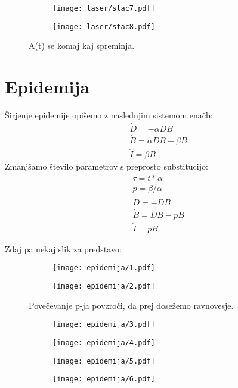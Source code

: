 \documentclass{article}
\begin{document}
\begin{figure}[H]
\centering
\begin{subfigure}{.49\textwidth}
\texttt{[image: laser/stac7.pdf]}
\end{subfigure}
\begin{subfigure}{.49\textwidth}
\texttt{[image: laser/stac8.pdf]}
\end{subfigure}
\caption*{A(t) se komaj kaj spreminja.}
\end{figure}


\section{Epidemija}

Širjenje epidemije opišemo z naslednjim sistemom enačb:
\begin{align*}
&\dot{D} = - \alpha D B \\
&\dot{B} = \alpha D B - \beta B \\
&\dot{I} = \beta B
\end{align*}
Zmanjšamo število parametrov s preprosto substitucijo:
\begin{align*}
&\tau = t*\alpha \\
&p = \beta / \alpha \\
&\dot{D} = - D B \\
&\dot{B} = D B - p B \\
&\dot{I} = p B
\end{align*}

Zdaj pa nekaj slik za predstavo:

\begin{figure}[H]
\centering
\begin{subfigure}{.49\textwidth}
\texttt{[image: epidemija/1.pdf]}
\end{subfigure}
\begin{subfigure}{.49\textwidth}
\texttt{[image: epidemija/2.pdf]}
\end{subfigure}
\caption*{Povečevanje p-ja povzroči, da prej dosežemo ravnovesje.}
\end{figure}

\begin{figure}[H]
\centering
\begin{subfigure}{.49\textwidth}
\texttt{[image: epidemija/3.pdf]}
\end{subfigure}
\begin{subfigure}{.49\textwidth}
\texttt{[image: epidemija/4.pdf]}
\end{subfigure}
\end{figure}
\begin{figure}[H]
\centering
\begin{subfigure}{.49\textwidth}
\texttt{[image: epidemija/5.pdf]}
\end{subfigure}
\begin{subfigure}{.49\textwidth}
\texttt{[image: epidemija/6.pdf]}
\end{subfigure}
\end{figure}
\end{document}
